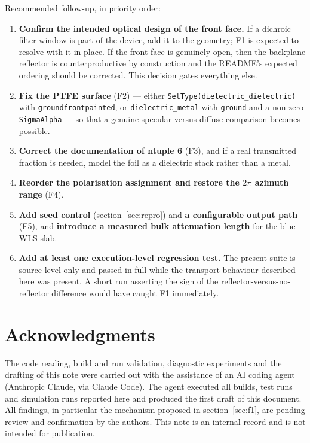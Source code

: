 \documentclass[a4paper,11pt]{article}
\begin{document}
Recommended follow-up, in priority order:

\begin{enumerate}
\item \textbf{Confirm the intended optical design of the front face.} If a
dichroic filter window is part of the device, add it to the geometry; F1 is
expected to resolve with it in place. If the front face is genuinely open, then
the backplane reflector is counterproductive by construction and the README's
expected ordering should be corrected. This decision gates everything else.
\item \textbf{Fix the PTFE surface} (F2) --- either \texttt{SetType(dielectric\_dielectric)}
with \texttt{groundfrontpainted}, or \texttt{dielectric\_metal} with
\texttt{ground} and a non-zero \texttt{SigmaAlpha} --- so that a genuine
specular-versus-diffuse comparison becomes possible.
\item \textbf{Correct the documentation of ntuple 6} (F3), and if a real
transmitted fraction is needed, model the foil as a dielectric stack rather than
a metal.
\item \textbf{Reorder the polarisation assignment and restore the $2\pi$ azimuth
range} (F4).
\item \textbf{Add seed control} (section~\ref{sec:repro}) and \textbf{a
configurable output path} (F5), and \textbf{introduce a measured bulk
attenuation length} for the blue-WLS slab.
\item \textbf{Add at least one execution-level regression test.} The present
suite is source-level only and passed in full while the transport behaviour
described here was present. A short run asserting the sign of the
reflector-versus-no-reflector difference would have caught F1 immediately.
\end{enumerate}

\section*{Acknowledgments}

The code reading, build and run validation, diagnostic experiments and the
drafting of this note were carried out with the assistance of an AI coding
agent (Anthropic Claude, via Claude Code). The agent executed all builds, test
runs and simulation runs reported here and produced the first draft of this
document. All findings, in particular the mechanism proposed in
section~\ref{sec:f1}, are pending review and confirmation by the authors. This
note is an internal record and is not intended for publication.
\end{document}
